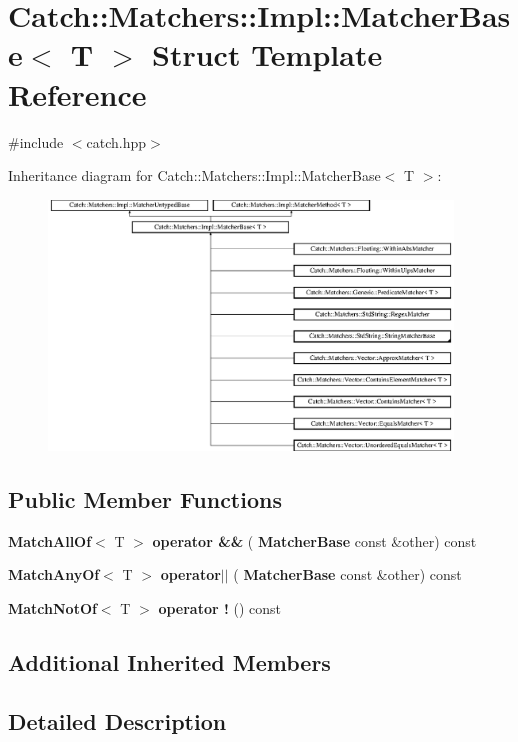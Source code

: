 \section{Catch\+::Matchers\+::Impl\+::Matcher\+Base$<$ T $>$ Struct Template Reference}
\label{struct_catch_1_1_matchers_1_1_impl_1_1_matcher_base}


{\ttfamily \#include $<$catch.\+hpp$>$}

Inheritance diagram for Catch\+::Matchers\+::Impl\+::Matcher\+Base$<$ T $>$\+:\begin{figure}[H]
\begin{center}
\leavevmode
\includegraphics[height=6.646884cm]{struct_catch_1_1_matchers_1_1_impl_1_1_matcher_base}
\end{center}
\end{figure}
\subsection*{Public Member Functions}
\begin{DoxyCompactItemize}
\item 
\textbf{ Match\+All\+Of}$<$ T $>$ \textbf{ operator \&\&} (\textbf{ Matcher\+Base} const \&other) const
\item 
\textbf{ Match\+Any\+Of}$<$ T $>$ \textbf{ operator$\vert$$\vert$} (\textbf{ Matcher\+Base} const \&other) const
\item 
\textbf{ Match\+Not\+Of}$<$ T $>$ \textbf{ operator !} () const
\end{DoxyCompactItemize}
\subsection*{Additional Inherited Members}


\subsection{Detailed Description}
